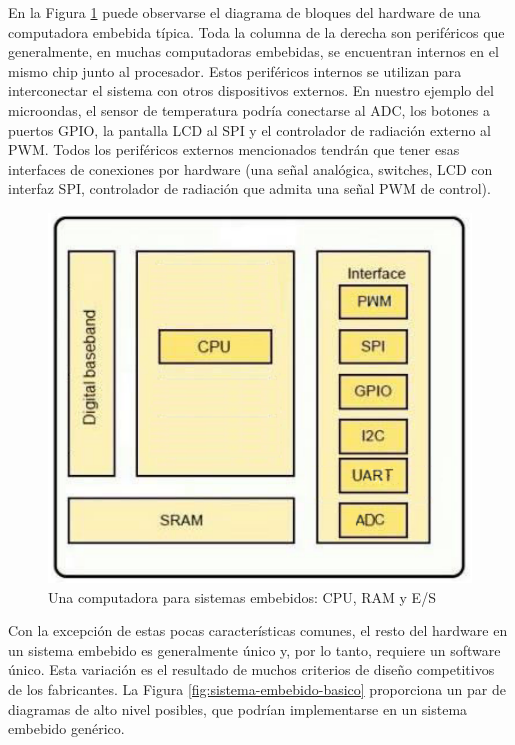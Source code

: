 \documentclass[output=paper, 
colorlinks,
citecolor=brown,
newtxmath
]{langscibook}
\begin{document}
En la Figura \ref{fig:hardware-basico} puede observarse el diagrama de bloques
del hardware de una computadora embebida típica.
Toda la columna de la derecha son periféricos que generalmente,
en muchas computadoras embebidas, se encuentran internos en el mismo chip
junto al procesador. Estos periféricos internos se utilizan 
para interconectar el sistema con otros dispositivos externos. En nuestro ejemplo
del microondas, el sensor de temperatura podría conectarse al ADC,
los botones a puertos GPIO, la pantalla LCD al SPI y el 
controlador de radiación externo al PWM.
Todos los periféricos externos mencionados tendrán que tener
esas interfaces de conexiones por hardware (una señal analógica,
switches, LCD con interfaz SPI, controlador de radiación
que admita una señal PWM de control).


\begin{figure}[h]
\includegraphics[scale=0.25]{images/hardware-basico.png}
\caption{Una computadora para sistemas embebidos: CPU, RAM y E/S}
\label{fig:hardware-basico}
\end{figure}




Con la excepción de estas pocas características comunes, el resto del hardware en un sistema
embebido es generalmente único y, por lo tanto, requiere un software único. 
Esta variación es el resultado de muchos criterios de diseño competitivos de los fabricantes.
La Figura \ref{fig:sistema-embebido-basico} proporciona un par de diagramas de alto nivel 
posibles, que podrían implementarse en un sistema embebido genérico.
\end{document}
